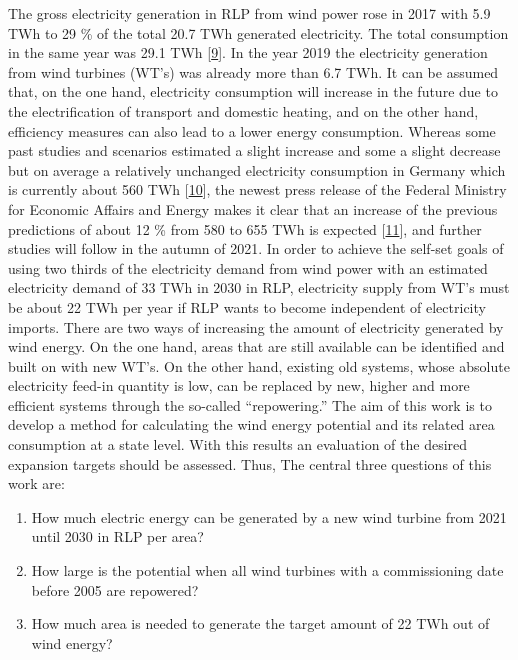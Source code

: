 \documentclass[a4paper,11pt]{article}
\begin{document}
The gross electricity generation in RLP from wind power rose in 2017 with 5.9 TWh to 29 \% of the total 20.7 TWh generated electricity. The total consumption in the same year was 29.1 TWh {[}\protect\hyperlink{ref-Lehnert.2020}{9}{]}. In the year 2019 the electricity generation from wind turbines (WT's) was already more than 6.7 TWh. It can be assumed that, on the one hand, electricity consumption will increase in the future due to the electrification of transport and domestic heating, and on the other hand, efficiency measures can also lead to a lower energy consumption. Whereas some past studies and scenarios estimated a slight increase and some a slight decrease but on average a relatively unchanged electricity consumption in Germany which is currently about 560 TWh {[}\protect\hyperlink{ref-NormanGerhardt.2015}{10}{]}, the newest press release of the Federal Ministry for Economic Affairs and Energy makes it clear that an increase of the previous predictions of about 12 \% from 580 to 655 TWh is expected {[}\protect\hyperlink{ref-AndreasMertens.13.07.2021}{11}{]}, and further studies will follow in the autumn of 2021. In order to achieve the self-set goals of using two thirds of the electricity demand from wind power with an estimated electricity demand of 33 TWh in 2030 in RLP, electricity supply from WT's must be about 22 TWh per year if RLP wants to become independent of electricity imports. There are two ways of increasing the amount of electricity generated by wind energy. On the one hand, areas that are still available can be identified and built on with new WT's. On the other hand, existing old systems, whose absolute electricity feed-in quantity is low, can be replaced by new, higher and more efficient systems through the so-called ``repowering.''
The aim of this work is to develop a method for calculating the wind energy potential and its related area consumption at a state level. With this results an evaluation of the desired expansion targets should be assessed. Thus, The central three questions of this work are:
\begin{enumerate}
\def\labelenumi{\arabic{enumi}.}
\item
  How much electric energy can be generated by a new wind turbine from 2021 until 2030 in RLP per area?
\item
  How large is the potential when all wind turbines with a commissioning date before 2005 are repowered?
\item
  How much area is needed to generate the target amount of 22 TWh out of wind energy?
\end{enumerate}
\end{document}
